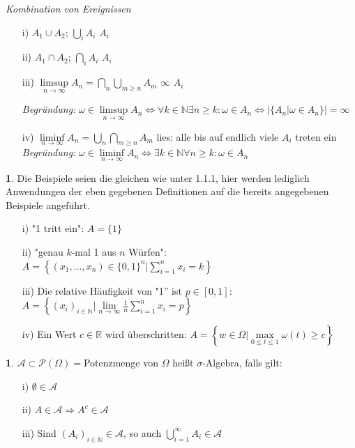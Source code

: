 \documentclass[10pt,a4paper]{report}
\numberwithin{equation}{section}
\numberwithin{figure}{section}
\theoremstyle{plain}
\theoremstyle{definition}
\newtheorem{defn}[thm]{\protect\definitionname}
\newtheorem{example}[thm]{\protect\examplename}
\theoremstyle{remark}
\theoremstyle{plain}
\providecommand{\definitionname}{Definition}
\providecommand{\examplename}{Beispiel}
\newcommand{\1}{ \mathbb{1} } %
\begin{document}
\textit{Kombination von Ereignissen}
\begin{itemize}
\item[i)] $A_1 \cup A_2$; $\bigcup\limits_i A_i$\qquad {} $A_i$  
\item[ii)] $A_1 \cap A_2$; $\bigcap\limits_i A_i$\qquad {} $A_i$  
\item[iii)] $\limsup\limits_{n \to \infty} A_n=\bigcap\limits_{n}\bigcup\limits_{m\geq n}A_m$\qquad {} $\infty$ $A_i$   

  \textit{Begründung:} $\omega \in \limsup\limits_{n \to \infty} A_n \Leftrightarrow \forall k \in \mathbb{N} \exists n\geq k: \omega \in A_n \Leftrightarrow |\{A_n|\omega \in A_n\}|=\infty$
\item[iv)] $\liminf\limits_{n \to \infty} A_n=\bigcup\limits_{n}\bigcap\limits_{m\geq n}A_m$ \qquad lies: alle bis auf endlich viele $A_i$ treten ein
  \textit{Begründung:} $\omega \in \liminf\limits_{n \to \infty} A_n \Leftrightarrow \exists k \in \mathbb{N} \forall n\geq k: \omega \in A_n$
\end{itemize}
\begin{example}
  Die Beispiele seien die gleichen wie unter 1.1.1, hier werden lediglich Anwendungen der eben gegebenen Definitionen auf die bereits angegebenen Beispiele angeführt.
  \begin{itemize}
  \item[i)] "1 tritt ein": $A=\{1\}$ 
  \item[ii)] "genau $k$-mal 1 aus $n$ Würfen": $A=\left\{(x_1,\dots,x_n) \in \{0,1\}^n| \sum\limits_{i=1}^nx_i=k\right\}$
  \item[iii)] Die relative Häufigkeit von "1'' ist $p \in [0,1]$: $A=\left\{(x_i)_{i \in \mathbb{N}}|\lim\limits_{n \to \infty}\frac{1}{n}\sum\limits_{i=1}^n x_i=p\right\}$
  \item[iv)] Ein Wert $c \in \mathbb{R}$ wird überschritten: $A=\left\{w \in \Omega| \max\limits_{0\leq t\leq 1}\omega(t)\geq c \right\}$  
  \end{itemize}
\end{example}
\begin{defn}  %
  $\mathcal{A}\subset \mathcal{P}(\Omega)=$Potenzmenge von  $\Omega$ heißt $\sigma$-Algebra, falls gilt: 
  \begin{itemize}
  \item[i)] $\emptyset \in \mathcal{A}$
  \item[ii)] $A\in \mathcal{A} \Rightarrow A^c
    \in \mathcal{A}$
  \item[iii)] Sind $(A_i)_{i \in \mathbb{N}} \in \mathcal{A}$,
    so auch $\bigcup\limits_{i=1}^\infty A_i \in \mathcal{A}$
  \end{itemize}
\end{defn}
\end{document}
